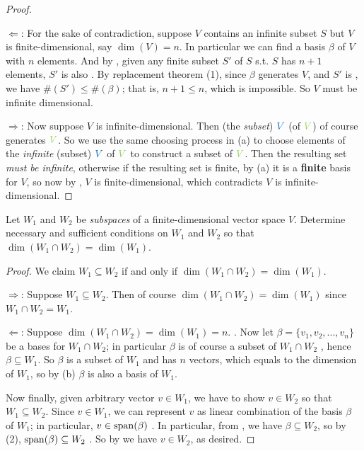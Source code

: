 \begin{proof} \ 

\(\Longleftarrow\): For the sake of contradiction, suppose \(V\) contains an infinite \LID{} subset \(S\) but \(V\) is finite-dimensional, say \(\dim(V) = n\).
In particular we can find a basis \(\beta\) of \(V\) with \(n\) elements.
And by , given any finite subset \(S'\) of \(S\) s.t. \(S\) has \(n + 1\) elements, \(S'\) is also \LID{}.
By replacement theorem (1), since \(\beta\) generates \(V\), and \(S'\) is \LID{}, we have \(\#(S') \le \#(\beta)\);
that is, \(n + 1 \le n\), which is impossible.
So \(V\) must be infinite dimensional.

\(\Longrightarrow\):
Now suppose \(V\) is infinite-dimensional.
Then (the \emph{subset}) \(\BLUE{V}\) (of \(\GREEN{V}\)) of course generates \(\GREEN{V}\).
So we use the same choosing process in (a) to choose elements of the \emph{infinite} (subset) \(\BLUE{V}\) of \(\GREEN{V}\) to construct a \LID{} subset of \(\GREEN{V}\).
Then the resulting set \emph{must be infinite}, otherwise if the resulting set is finite, by (a) it is a \textbf{finite} basis for \(V\), so now by , \(V\) is finite-dimensional, which contradicts \(V\) is infinite-dimensional.
\end{proof}

\begin{exercise} \label{exercise 1.6.22}
Let \(W_1\) and \(W_2\) be \emph{subspaces} of a finite-dimensional vector space \(V\).
Determine necessary and sufficient conditions on \(W_1\) and \(W_2\) so that \(\dim(W_1 \cap W_2) = \dim(W_1)\).
\end{exercise}

\begin{proof}
We claim \(W_1 \subseteq W_2\) if and only if \(\dim(W_1 \cap W_2) = \dim(W_1)\).

\(\Longrightarrow\): Suppose \(W_1 \subseteq W_2\).
Then of course \(\dim(W_1 \cap W_2) = \dim(W_1)\) since \(W_1 \cap W_2 = W_1\).

\(\Longleftarrow\):
Suppose \(\dim(W_1 \cap W_2) = \dim(W_1) = n\). .
Now let \(\beta = \{ v_1, v_2, ..., v_n \}\) be a bases for \(W_1 \cap W_2\); in particular \(\beta\) is of course a subset of \(W_1 \cap W_2\) , hence \(\beta \subseteq W_1\).
So \(\beta\) is a \LID{} subset of \(W_1\) and has \(n\) vectors, which equals to the dimension of \(W_1\), so by (b) \(\beta\) is also a basis of \(W_1\).

Now finally, given arbitrary vector \(v \in W_1\), we have to show \(v \in W_2\) so that \(W_1 \subseteq W_2\).
Since \(v \in W_1\), we can represent \(v\) as linear combination of the basis \(\beta\) of \(W_1\); in particular, \(v \in \operatorname{span}(\beta)\) .
In particular, from , we have \(\beta \subseteq W_2\), so by (2), \(\operatorname{span}(\beta) \subseteq W_2\) .
So by  we have \(v \in W_2\), as desired.
\end{proof}

